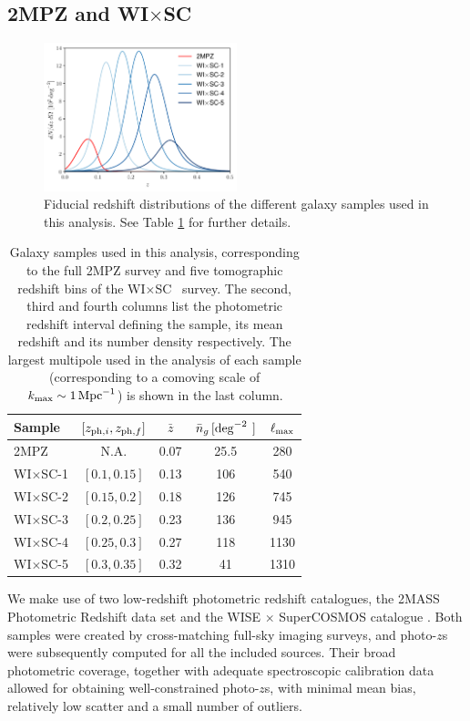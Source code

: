 \documentclass[useAMS,usenatbib]{mn2e}
\newcommand{\wisc}{WI$\times$SC}
\begin{document}
  \subsection{2MPZ and \wisc}\label{ssec:data.g1}
    \begin{figure}
      \centering
      \includegraphics[width=0.5\textwidth]{nzs.pdf}
      \caption{Fiducial redshift distributions of the different galaxy samples used in this analysis. See Table \ref{tab:z_bins} for further details.}
      \label{fig:dndz}
    \end{figure}
    \begin{table}
      \begin{center}
        \begin{tabular}{l|cccc}
          \hline
          Sample & $[z_{{\rm ph},i},z_{{\rm ph},f}]$ & $\bar{z}$ & $\bar{n}_g\,[{\rm deg}^{-2^{\phantom{2}}}]$ & $\ell_{\rm max}$\\[1ex]
          \hline
          2MPZ    & N.A.         & 0.07 &  25.5 &  280 \\
          \wisc-1 & $[0.1,0.15]$ & 0.13 & 106   &  540 \\
          \wisc-2 & $[0.15,0.2]$ & 0.18 & 126   &  745 \\
          \wisc-3 & $[0.2,0.25]$ & 0.23 & 136   &  945 \\
          \wisc-4 & $[0.25,0.3]$ & 0.27 & 118   & 1130 \\
          \wisc-5 & $[0.3,0.35]$ & 0.32 & 41    & 1310 \\
          \hline
        \end{tabular}
        \caption{Galaxy samples used in this analysis, corresponding to the full 2MPZ survey and five tomographic redshift bins of the \wisc~ survey. The second, third and fourth columns list the photometric redshift interval defining the sample, its mean redshift and its number density respectively. The largest multipole used in the analysis of each sample (corresponding to a comoving scale of $k_{\rm max}\sim 1\,{\rm Mpc}^{-1}$) is shown in the last column.}\label{tab:z_bins}
      \end{center}
    \end{table} 
    We make use of two low-redshift photometric redshift catalogues, the 2MASS Photometric Redshift data set \citep[2MPZ,][]{2014ApJS..210....9B} and the WISE $\times$ SuperCOSMOS catalogue \citep[\wisc,][]{2016ApJS..225....5B}. Both samples were created by cross-matching full-sky imaging surveys, and photo-$z$s were subsequently computed for all the included sources. Their broad photometric coverage, together with adequate spectroscopic calibration data allowed for obtaining well-constrained photo-$z$s, with minimal mean bias, relatively low scatter and a small number of outliers.
    
\end{document}
